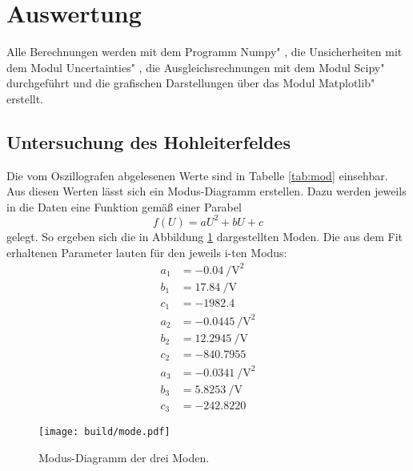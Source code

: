 \section{Auswertung}
\label{sec:Auswertung}
Alle Berechnungen werden mit dem Programm \glqq Numpy" \cite{numpy}, die Unsicherheiten mit dem Modul \glqq Uncertainties" \cite{uncertainties}, die Ausgleichsrechnungen mit dem Modul \glqq Scipy" \cite{scipy} durchgeführt und die grafischen Darstellungen über das Modul \glqq Matplotlib" \cite{matplotlib} erstellt.


\subsection{Untersuchung des Hohleiterfeldes}

Die vom Oszillografen abgelesenen Werte sind in Tabelle \ref{tab:mod} einsehbar. 
Aus diesen Werten lässt sich ein Modus-Diagramm erstellen. Dazu werden jeweils in die Daten eine Funktion gemäß einer Parabel
\begin{equation}
    f(U) = aU^2+bU+c
\end{equation}
gelegt. 
So ergeben sich die in Abbildung \ref{fig:mode} dargestellten Moden. Die aus dem Fit erhaltenen Parameter lauten für den jeweils i-ten Modus:
\begin{align*}
    a_1 & = \SI{-0.04}{\per\square\volt} \\
    b_1 & = \SI{17.84}{\per\volt} \\
    c_1 & = \num{-1982.4} \\
    a_2 & = \SI{-0.0445}{\per\square\volt} \\
    b_2 & = \SI{ 12.2945}{\per\volt} \\
    c_2 & = \num{-840.7955} \\
    a_3 & = \SI{-0.0341}{\per\square\volt} \\
    b_3 & = \SI{5.8253}{\per\volt} \\
    c_3 & = \num{-242.8220}
\end{align*}


\begin{figure}
    \centering
    \texttt{[image: build/mode.pdf]}
    \caption{Modus-Diagramm der drei Moden.}
    \label{fig:mode}
\end{figure}



